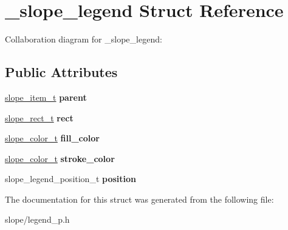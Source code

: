 \hypertarget{struct__slope__legend}{\section{\+\_\+slope\+\_\+legend Struct Reference}
\label{struct__slope__legend}
}


Collaboration diagram for \+\_\+slope\+\_\+legend\+:
\subsection*{Public Attributes}
\begin{DoxyCompactItemize}
\item 
\hypertarget{struct__slope__legend_aced1e1584bd8ba4cbe7ffc3ad0dadc44}{\hyperlink{group__Item_ga2616141f0e164a876049da51ea3a8646}{slope\+\_\+item\+\_\+t} {\bfseries parent}}\label{struct__slope__legend_aced1e1584bd8ba4cbe7ffc3ad0dadc44}

\item 
\hypertarget{struct__slope__legend_ae18a7deffb619252b055672110703bb9}{\hyperlink{struct__slope__rect}{slope\+\_\+rect\+\_\+t} {\bfseries rect}}\label{struct__slope__legend_ae18a7deffb619252b055672110703bb9}

\item 
\hypertarget{struct__slope__legend_a1abf347ffdf1ce3630e03ef93bc79a3b}{\hyperlink{struct__slope__color}{slope\+\_\+color\+\_\+t} {\bfseries fill\+\_\+color}}\label{struct__slope__legend_a1abf347ffdf1ce3630e03ef93bc79a3b}

\item 
\hypertarget{struct__slope__legend_a9be59a3fcd403e9455211399c9dabe9e}{\hyperlink{struct__slope__color}{slope\+\_\+color\+\_\+t} {\bfseries stroke\+\_\+color}}\label{struct__slope__legend_a9be59a3fcd403e9455211399c9dabe9e}

\item 
\hypertarget{struct__slope__legend_aac6517fed40bc604f90d188c88c39c8b}{slope\+\_\+legend\+\_\+position\+\_\+t {\bfseries position}}\label{struct__slope__legend_aac6517fed40bc604f90d188c88c39c8b}

\end{DoxyCompactItemize}


The documentation for this struct was generated from the following file\+:\begin{DoxyCompactItemize}
\item 
slope/legend\+\_\+p.\+h\end{DoxyCompactItemize}
